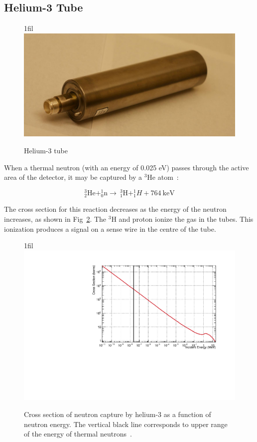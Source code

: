 \documentclass{article}
\makeatletter
\newcommand*{\centerfloat}{%
  \parindent \z@
  \leftskip \z@ \@plus 1fil \@minus \textwidth
  \rightskip\leftskip
  \parfillskip \z@skip}
\makeatother
\begin{document}
\subsection{Helium-3 Tube}

\begin{figure}
	\centerfloat
		\includegraphics[width=\columnwidth]{images/he3tubePhoto}
	\caption[Helium-3 tube]{Helium-3 tube}
	\label{fig:he3photo}
\end{figure}


When a thermal neutron (with an energy of 0.025 eV) passes through the active area of the detector, it may be captured by a $^3$He atom~\cite{Oed200462}:

\begin{equation}
		{^{3}_{2}\mathrm{He}+^{1}_{0}\mathrm{n}\rightarrow~^{3}_{1}\mathrm{H}+^{1}_{1}H+764~\mathrm{keV}}
\end{equation}

The cross section for this reaction decreases as the energy of the neutron increases, as shown in Fig~\ref{fig:neutCross}. The $^3$H and proton ionize the gas in the tubes. This ionization produces a signal on a sense wire in the centre of the tube.

\begin{figure}
	\centerfloat
		\includegraphics[width=\textwidth]{images/neutron_cross_section}
	\caption[Cross section of neutron capture by helium-3 as a function of neutron energy]{Cross section of neutron capture by helium-3 as a function of neutron energy. The vertical black line corresponds to upper range of the energy of thermal neutrons~\cite{BNL}.}
	\label{fig:neutCross}
\end{figure}
\end{document}
